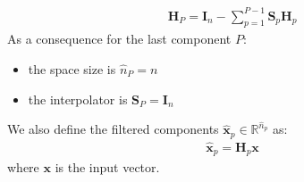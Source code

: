 \documentclass[12pt]{scrartcl}
\begin{document}
\begin{align}
\label{eq:bp1}
\mathbf{H}_P = \mathbf{I}_n - \sum_{p=1}^{P-1} \mathbf{S}_p \mathbf{H}_p
\end{align}
As a consequence for the last component $P$:
\begin{itemize}
\item the space size is $\widehat{n}_P = n$
\item the interpolator is $\mathbf{S}_P = \mathbf{I}_n$
\end{itemize}
We also define the filtered components $\widehat{\mathbf{x}}_p \in \mathbb{R}^{\widehat{n}_p}$ as:
\begin{align}
\label{eq:bp2}
\widehat{\mathbf{x}}_p = \mathbf{H}_p \mathbf{x}
\end{align}
where $\mathbf{x}$ is the input vector.
\end{document}
